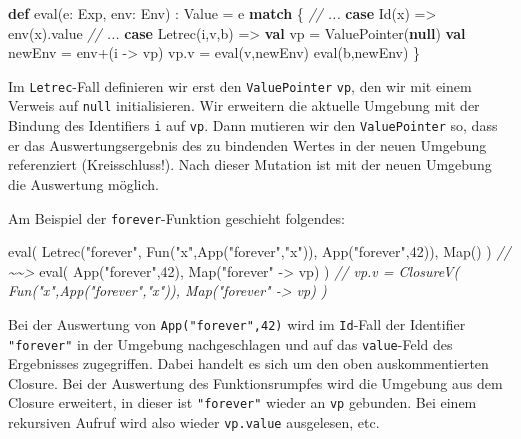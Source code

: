 \documentclass[]{article}
\newenvironment{Shaded}{}{}
\newcommand{\CommentTok}[1]{\textcolor[rgb]{0.38,0.63,0.69}{\textit{#1}}}
\newcommand{\DecValTok}[1]{\textcolor[rgb]{0.25,0.63,0.44}{#1}}
\newcommand{\FunctionTok}[1]{\textcolor[rgb]{0.02,0.16,0.49}{#1}}
\newcommand{\KeywordTok}[1]{\textcolor[rgb]{0.00,0.44,0.13}{\textbf{#1}}}
\newcommand{\NormalTok}[1]{#1}
\newcommand{\StringTok}[1]{\textcolor[rgb]{0.25,0.44,0.63}{#1}}
\begin{document}
\begin{Shaded}
\begin{Highlighting}[]
\KeywordTok{def} \FunctionTok{eval}\NormalTok{(e: Exp, env: Env) : Value = e }\KeywordTok{match}\NormalTok{ \{}
  \CommentTok{// ...}
  \KeywordTok{case} \FunctionTok{Id}\NormalTok{(x) =\textgreater{} }\FunctionTok{env}\NormalTok{(x).}\FunctionTok{value}
  \CommentTok{// ...}
  \KeywordTok{case} \FunctionTok{Letrec}\NormalTok{(i,v,b) =\textgreater{}}
    \KeywordTok{val}\NormalTok{ vp = }\FunctionTok{ValuePointer}\NormalTok{(}\KeywordTok{null}\NormalTok{)}
    \KeywordTok{val}\NormalTok{ newEnv = env+(i {-}\textgreater{} vp)}
\NormalTok{    vp.}\FunctionTok{v}\NormalTok{ = }\FunctionTok{eval}\NormalTok{(v,newEnv)}
    \FunctionTok{eval}\NormalTok{(b,newEnv)}
\NormalTok{\}}
\end{Highlighting}
\end{Shaded}

Im \texttt{Letrec}-Fall definieren wir erst den \texttt{ValuePointer}
\texttt{vp}, den wir mit einem Verweis auf \texttt{null} initialisieren.
Wir erweitern die aktuelle Umgebung mit der Bindung des Identifiers
\texttt{i} auf \texttt{vp}. Dann mutieren wir den \texttt{ValuePointer}
so, dass er das Auswertungsergebnis des zu bindenden Wertes in der neuen
Umgebung referenziert (Kreisschluss!). Nach dieser Mutation ist mit der
neuen Umgebung die Auswertung möglich.

Am Beispiel der \texttt{forever}-Funktion geschieht folgendes:

\begin{Shaded}
\begin{Highlighting}[]
\FunctionTok{eval}\NormalTok{( }\FunctionTok{Letrec}\NormalTok{(}\StringTok{"forever"}\NormalTok{, }\FunctionTok{Fun}\NormalTok{(}\StringTok{"x"}\NormalTok{,}\FunctionTok{App}\NormalTok{(}\StringTok{"forever"}\NormalTok{,}\StringTok{"x"}\NormalTok{)), }\FunctionTok{App}\NormalTok{(}\StringTok{"forever"}\NormalTok{,}\DecValTok{42}\NormalTok{)), Map() )}
\CommentTok{// \textasciitilde{}\textasciitilde{}\textgreater{}}
\FunctionTok{eval}\NormalTok{( }\FunctionTok{App}\NormalTok{(}\StringTok{"forever"}\NormalTok{,}\DecValTok{42}\NormalTok{), Map(}\StringTok{"forever"}\NormalTok{ {-}\textgreater{} vp) )}
\CommentTok{// vp.v = ClosureV( Fun("x",App("forever","x")), Map("forever" {-}\textgreater{} vp) )}
\end{Highlighting}
\end{Shaded}

Bei der Auswertung von \texttt{App("forever",42)} wird im
\texttt{Id}-Fall der Identifier \texttt{"forever"} in der Umgebung
nachgeschlagen und auf das \texttt{value}-Feld des Ergebnisses
zugegriffen. Dabei handelt es sich um den oben auskommentierten Closure.
Bei der Auswertung des Funktionsrumpfes wird die Umgebung aus dem
Closure erweitert, in dieser ist \texttt{"forever"} wieder an
\texttt{vp} gebunden. Bei einem rekursiven Aufruf wird also wieder
\texttt{vp.value} ausgelesen, etc.
\end{document}
